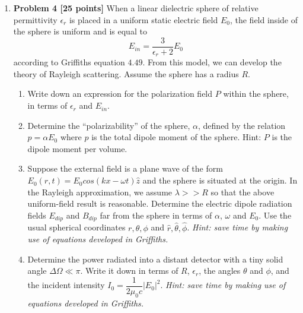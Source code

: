 \documentclass[fleqn]{article}
\begin{document}
\begin{enumerate}
    \pagebreak

    \item \textbf{Problem 4 [25 points]}
    When a linear dielectric sphere of relative permittivity $\epsilon_r$ is placed in a uniform static electric 
    field $E_0$, the field inside of the sphere is uniform and is equal to
    $$
      E_{in}=\dfrac{3}{\epsilon_r+2} E_0
    $$
    according to Griffiths equation $4.49$. From this model, we can develop the theory of Rayleigh scattering.
    Assume the sphere has a radius $R$.
    \begin{enumerate}
      \item Write down an expression for the polarization field $P$ within the sphere, in terms of 
      $\epsilon_r$ and $E_{in}$.

      \item Determine the “polarizability” of the sphere, $\alpha$, defined by the relation $p=\alpha E_0$ 
      where $p$ is the total dipole moment of the sphere. Hint: $P$ is the dipole moment per volume.

      \item Suppose the external field is a plane wave of the form $E_0(r,t)=E_0 cos(kx-\omega t) \hat{z}$ and the
      sphere is situated at the origin. In the Rayleigh approximation, we assume $\lambda >> R$ so that the
      above uniform-field result is reasonable. Determine the electric dipole radiation fields $E_{dip}$ and
      $B_{dip}$ far from the sphere in terms of $\alpha$, $\omega$ and $E_0$. Use the usual spherical coordinates 
      $r, \theta, \phi$ and $\hat{r}, \hat{\theta}, \hat{\phi}$. 
      \emph{Hint: save time by making use of equations developed in Griffiths.}


      \item Determine the power radiated into a distant detector with a tiny solid angle $\Delta \Omega ≪ \pi$. 
      Write it down in terms of $R$, $\epsilon_r$, the angles $\theta$ and $\phi$, and the incident intensity 
      $I_0=\dfrac{1}{2 \mu_0 c}|E_0|^2$. \emph{Hint: save time by making use of equations developed in Griffiths.}
    \end{enumerate}
    
    \pagebreak

  \end{enumerate}
\end{document}
